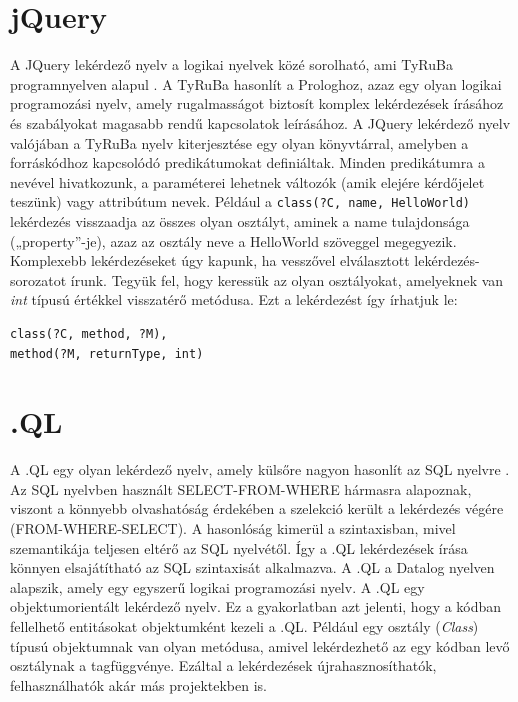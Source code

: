 \documentclass[a4paper,12pt]{report}
\begin{document}
\section{jQuery}
A JQuery lekérdező nyelv a logikai nyelvek közé sorolható, ami TyRuBa programnyelven alapul \cite{jquery}. A TyRuBa hasonlít a Prologhoz, azaz egy olyan logikai programozási nyelv, amely rugalmasságot biztosít komplex lekérdezések írásához és szabályokat magasabb rendű kapcsolatok leírásához. A JQuery lekérdező nyelv valójában a TyRuBa nyelv kiterjesztése egy olyan könyvtárral, amelyben a forráskódhoz kapcsolódó predikátumokat definiáltak. Minden predikátumra a nevével hivatkozunk, a paraméterei lehetnek változók (amik elejére kérdőjelet teszünk) vagy attribútum nevek. Például a \texttt{class(?C, name, HelloWorld)} lekérdezés visszaadja az összes olyan osztályt, aminek a name tulajdonsága („property”-je), azaz az osztály neve a HelloWorld szöveggel megegyezik. Komplexebb lekérdezéseket úgy kapunk, ha vesszővel elválasztott lekérdezés-sorozatot írunk. Tegyük fel, hogy keressük az olyan osztályokat, amelyeknek van \textit{int} típusú értékkel visszatérő metódusa. Ezt a lekérdezést így írhatjuk le:

\begin{verbatim}
class(?C, method, ?M),
method(?M, returnType, int)
\end{verbatim}

\section{.QL}
A .QL egy olyan lekérdező nyelv, amely külsőre nagyon hasonlít az SQL nyelvre \cite{dotql}. Az SQL nyelvben használt SELECT-FROM-WHERE hármasra alapoznak, viszont a könnyebb olvashatóság érdekében a szelekció került a lekérdezés végére (FROM-WHERE-SELECT). A hasonlóság kimerül a szintaxisban, mivel szemantikája teljesen eltérő az SQL nyelvétől. Így a .QL lekérdezések írása könnyen elsajátítható az SQL szintaxisát alkalmazva. A .QL a Datalog nyelven alapszik, amely egy egyszerű logikai programozási nyelv. A .QL egy objektumorientált lekérdező nyelv. Ez a gyakorlatban azt jelenti, hogy a kódban fellelhető entitásokat objektumként kezeli a .QL. Például egy osztály (\textit{Class}) típusú objektumnak van olyan metódusa, amivel lekérdezhető az egy kódban levő osztálynak a tagfüggvénye. Ezáltal a lekérdezések újrahasznosíthatók, felhasználhatók akár más projektekben is.
\end{document}
